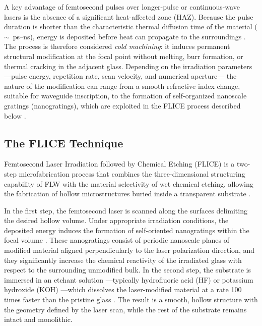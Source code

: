 A key advantage of femtosecond pulses over longer-pulse or continuous-wave lasers 
is the absence of a significant heat-affected zone (HAZ). Because the pulse 
duration is shorter than the characteristic thermal diffusion time of the material 
($\sim$~ps--ns), energy is deposited before heat can propagate to the 
surroundings \cite{gattass2008, osellame2012}. The process is therefore 
considered \textit{cold machining}: it induces permanent structural modification 
at the focal point without melting, burr formation, or thermal cracking in the 
adjacent glass. Depending on the irradiation parameters ---pulse energy, repetition 
rate, scan velocity, and numerical aperture--- the nature of the modification can 
range from a smooth refractive index change, suitable for waveguide inscription, 
to the formation of self-organized nanoscale gratings (nanogratings), which are 
exploited in the \gls{FLICE} process described below \cite{corrielli2021}.

\subsection{The FLICE Technique}
\label{sec:flice_process}

Femtosecond Laser Irradiation followed by Chemical Etching (FLICE) is a 
two-step microfabrication process that combines the three-dimensional 
structuring capability of FLW with the material selectivity of wet chemical 
etching, allowing the fabrication of hollow microstructures buried inside 
a transparent substrate \cite{sugioka2005, osellame2011}.

In the first step, the femtosecond laser is scanned along the surfaces 
delimiting the desired hollow volume. Under appropriate irradiation conditions, 
the deposited energy induces the formation of self-oriented nanogratings within 
the focal volume \cite{bhardwaj2006}. These nanogratings consist of periodic 
nanoscale planes of modified material aligned perpendicularly to the laser 
polarization direction, and they significantly increase the chemical reactivity 
of the irradiated glass with respect to the surrounding unmodified bulk. In the 
second step, the substrate is immersed in an etchant solution ---typically 
hydrofluoric acid (HF) or potassium hydroxide (KOH) ---which dissolves the 
laser-modified material at a rate 100 times faster than the pristine 
glass \cite{osellame2012}. The result is a smooth, hollow structure with the 
geometry defined by the laser scan, while the rest of the substrate remains 
intact and monolithic.

